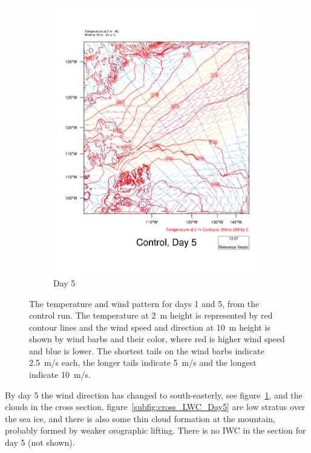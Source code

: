 \begin{figure}
\begin{subfigure}{0.48\textwidth}
        \includegraphics[width=\textwidth]{results/control/T2UV10_Control_Day5.pdf}
        \caption{Day 5}
        \label{subfig:weather_cont_day5}
    \end{subfigure}
    \caption{The temperature and wind pattern for days 1 and 5, from the control run. The temperature at 2~m height is represented by red contour lines and the wind speed and direction at 10~m height is shown by wind barbs and their color, where red is higher wind speed and blue is lower. The shortest tails on the wind barbs indicate 2.5~m/s each, the longer tails indicate 5~m/s and the longest indicate 10~m/s.}
    \label{fig:weather}
\end{figure}

By day 5 the wind direction has changed to south-easterly, see figure~\ref{subfig:weather_cont_day5}, and the clouds in the cross section, figure~\ref{subfig:cross_LWC_Day5} are low stratus over the sea ice, and there is also some thin cloud formation at the mountain, probably formed by weaker orographic lifting. There is no IWC in the section for day 5 (not shown).

